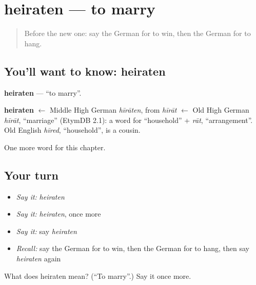 \section[heiraten]{heiraten — to marry}

\label{lesson:GE-C147-heiraten}



\begin{quote}
Before the new one: say the German for to win, then the German for to hang.
\end{quote}

\subsection*{You'll want to know: heiraten}
\textbf{heiraten} — \textquotedblleft{}to marry\textquotedblright{}.

\begin{cousinweb}
\textbf{heiraten} $\leftarrow$ Middle High German \emph{hīrāten}, from \emph{hīrāt} $\leftarrow$ Old High German \emph{hīrāt}, \textquotedblleft{}marriage\textquotedblright{} (EtymDB 2.1): a word for \textquotedblleft{}household\textquotedblright{} + \emph{rāt}, \textquotedblleft{}arrangement\textquotedblright{}. Old English \emph{hīred}, \textquotedblleft{}household\textquotedblright{}, is a cousin.
\end{cousinweb}

\begin{grammarlens}[title={What you've built}]
One more word for this chapter.
\end{grammarlens}

\subsection*{Your turn}
\begin{itemize}
\raggedright
  \item \emph{Say it:} \emph{heiraten}
  \item \emph{Say it:} \emph{heiraten}, once more
  \item \emph{Say it:} say \emph{heiraten}
  \item \emph{Recall:} say the German for to win, then the German for to hang, then say \emph{heiraten} again
\end{itemize}

\begin{tcolorbox}[breakable,colback=teal!4,colframe=teal!35!black,title={Before you move on}]
What does heiraten mean? (\textquotedblleft{}To marry\textquotedblright{}.) Say it once more.
\end{tcolorbox}
